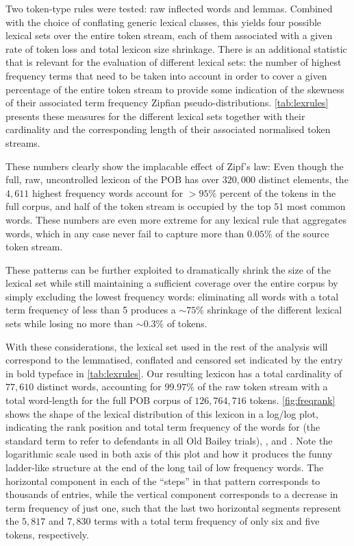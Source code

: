 Two token-type rules were tested: raw inflected words and lemmas.
Combined with the choice of conflating generic lexical classes, this yields four possible lexical sets over the entire token stream, each of them associated with a given rate of token loss and total lexicon size shrinkage.
There is an additional statistic that is relevant for the evaluation of different lexical sets: the number of highest frequency terms that need to be taken into account in order to cover a given percentage of the entire token stream to provide some indication of the skewness of their associated term frequency Zipfian pseudo-distributions.
\autoref{tab:lexrules} presents these measures for the different lexical sets together with their cardinality and the corresponding length of their associated normalised token streams.



These numbers clearly show the implacable effect of Zipf's law: Even though the full, raw, uncontrolled lexicon of the POB has over $320,000$ distinct elements, the $4,611$ highest frequency words account for $>95\%$ percent of the tokens in the full corpus, and half of the token stream is occupied by the top $51$ most common words.
These numbers are even more extreme for any lexical rule that aggregates words, which in any case never fail to capture more than $0.05\%$ of the source token stream.

These patterns can be further exploited to dramatically shrink the size of the lexical set while still maintaining a sufficient coverage over the entire corpus by simply excluding the lowest frequency words: eliminating all words with a total term frequency of less than 5 produces a $\sim75\%$ shrinkage of the different lexical sets while losing no more than $\sim0.3\%$ of tokens.

With these considerations, the lexical set used in the rest of the analysis will correspond to the lemmatised, conflated and censored set indicated by the entry in bold typeface in \autoref{tab:lexrules}.
Our resulting lexicon has a total cardinality of $77,610$ distinct words, accounting for $99.97\%$ of the raw token stream with a total word-length for the full POB corpus of $126,764,716$ tokens.
\autoref{fig:freqrank} shows the shape of the lexical distribution of this lexicon in a log/log plot, indicating the rank position and total term frequency of the words for  (the standard term to refer to defendants in all Old Bailey trials), ,  and .
Note the logarithmic scale used in both axis of this plot and how it produces the funny ladder-like structure at the end of the long tail of low frequency words.
The horizontal component in each of the ``steps'' in that pattern corresponds to thousands of entries, while the vertical component corresponds to a decrease in term frequency of just one, such that the last two horizontal segments represent the $5,817$ and $7,830$ terms with a total term frequency of only six and five tokens, respectively.

